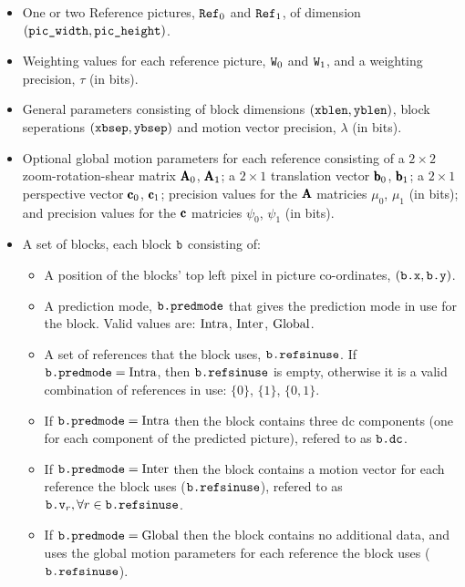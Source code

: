 \begin{itemize}
\item One or two Reference pictures, $\text{\texttt{Ref}}_0$ and $\text{\texttt{Ref}}_1$, of dimension
$(\text{\texttt{pic\_width}}, \text{\texttt{pic\_height}})$.

\item Weighting values for each reference picture, $\text{\texttt{W}}_0$ and $\text{\texttt{W}}_1$,
and a weighting precision, $\tau$ (in bits).

\item General parameters consisting of block dimensions $(\text{\texttt{xblen}},
\text{\texttt{yblen}})$, block seperations $(\text{\texttt{xbsep}}, \text{\texttt{ybsep}})$ and motion vector
precision, $\lambda$ (in bits).

\item Optional global motion parameters for each reference consisting of
a $2\times2$ zoom-rotation-shear matrix $\pmb{\text{A}}_0$, $\pmb{\text{A}}_1$; a
$2\times1$ translation vector $\pmb{\text{b}}_0$, $\pmb{\text{b}}_1$; a $2\times1$
perspective vector $\pmb{\text{c}}_0$, $\pmb{\text{c}}_1$; precision values for the $\pmb{\text{A}}$
matricies $\mu_0$, $\mu_1$ (in bits); and precision values for the
$\pmb{\text{c}}$ matricies $\psi_0$, $\psi_1$ (in bits).

\item A set of blocks, each block $\text{\texttt{b}}$ consisting of:
  \begin{itemize}
    \item A position of the blocks' top left pixel in picture
    co-ordinates, $(\text{\texttt{b.x}}, \text{\texttt{b.y}})$.

    \item A prediction mode, $\text{\texttt{b.predmode}}$ that gives the prediction mode
    in use for the block.  Valid values are: $\text{Intra}$, $\text{Inter}$,
    $\text{Global}$.

    \item A set of references that the block uses, $\text{\texttt{b.refsinuse}}$.
    If $\text{\texttt{b.predmode}} = \text{Intra}$, then $\text{\texttt{b.refsinuse}}$ is empty, otherwise
    it is a valid combination of references in use: $\lbrace0\rbrace$,
    $\lbrace1\rbrace$, $\lbrace0,1\rbrace$.

    \item If $\text{\texttt{b.predmode}} = \text{Intra}$ then the block contains three dc
    components (one for each component of the predicted picture),
    refered to as $\text{\texttt{b.dc}}$.

    \item If $\text{\texttt{b.predmode}} = \text{Inter}$ then the block contains a motion
    vector for each reference the block uses ($\text{\texttt{b.refsinuse}}$), refered to
    as $\text{\texttt{b.v}}_r, \forall r \in \text{\texttt{b.refsinuse}}$.

    \item If $\text{\texttt{b.predmode}} = \text{Global}$ then the block contains no
    additional data, and uses the global motion parameters for each
    reference the block uses ($\text{\texttt{b.refsinuse}}$).
  \end{itemize}
\end{itemize}

